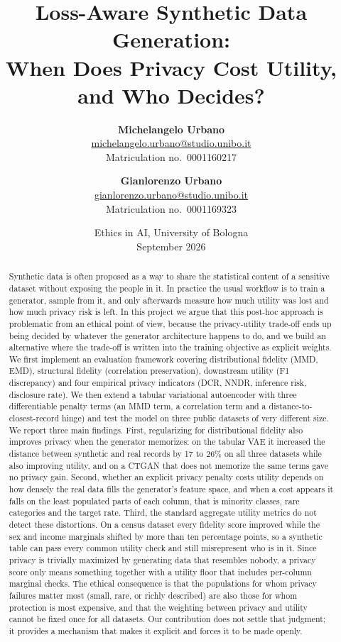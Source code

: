 \documentclass[11pt,a4paper]{article}
\title{Loss-Aware Synthetic Data Generation:\\
\large When Does Privacy Cost Utility, and Who Decides?}
\author{
  \textbf{Michelangelo Urbano}\\
  \small\href{mailto:michelangelo.urbano@studio.unibo.it}{michelangelo.urbano@studio.unibo.it}\\
  \small Matriculation no.\ 0001160217
  \and
  \textbf{Gianlorenzo Urbano}\\
  \small\href{mailto:gianlorenzo.urbano@studio.unibo.it}{gianlorenzo.urbano@studio.unibo.it}\\
  \small Matriculation no.\ 0001169323
}
\date{Ethics in AI, University of Bologna \\ September 2026}
\begin{document}
\maketitle

\begin{abstract}
\noindent
Synthetic data is often proposed as a way to share the statistical content of
a sensitive dataset without exposing the people in it. In practice the usual
workflow is to train a generator, sample from it, and only afterwards measure
how much utility was lost and how much privacy risk is left. In this project we
argue that this post-hoc approach is problematic from an ethical point of view,
because the privacy-utility trade-off ends up being decided by whatever the
generator architecture happens to do, and we build an alternative where the
trade-off is written into the training objective as explicit weights. We first
implement an evaluation framework covering distributional fidelity (MMD, EMD),
structural fidelity (correlation preservation), downstream utility (F1
discrepancy) and four empirical privacy indicators (DCR, NNDR, inference risk,
disclosure rate). We then extend a tabular variational autoencoder with three
differentiable penalty terms (an MMD term, a correlation term and a
distance-to-closest-record hinge) and test the model on three public datasets
of very different size. We report three main findings. First, regularizing
for distributional fidelity also improves privacy when the generator
memorizes: on the tabular VAE it increased the distance between synthetic and
real records by 17 to 26\% on all three datasets while also improving utility,
and on a CTGAN that does not memorize the same terms gave no privacy gain.
Second, whether an explicit privacy penalty costs
utility depends on how densely the real data fills the generator's feature
space, and when a cost appears it falls on the least populated parts of each
column, that is minority classes, rare categories and the target rate. Third,
the standard aggregate utility metrics do not detect these distortions. On a
census dataset every fidelity score improved while the sex and income
marginals shifted by more than ten percentage points, so a synthetic table can
pass every common utility check and still misrepresent who is in it. Since
privacy is trivially maximized by generating data that resembles nobody, a
privacy score only means something together with a utility floor that includes
per-column marginal checks. The ethical consequence is that the populations
for whom privacy failures matter most (small, rare, or richly described) are
also those for whom protection is most expensive, and that the weighting
between privacy and utility cannot be fixed once for all datasets. Our
contribution does not settle that judgment; it provides a mechanism that makes
it explicit and forces it to be made openly.
\end{abstract}
\end{document}
